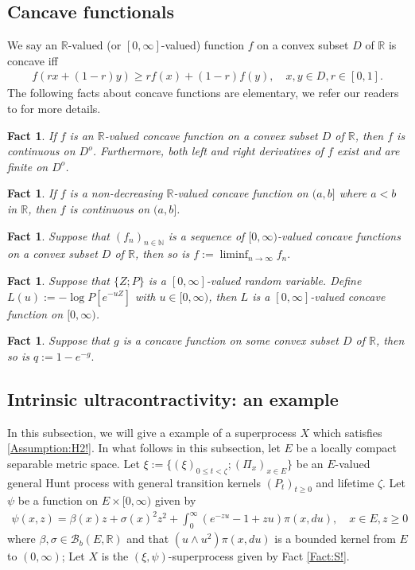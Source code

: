 \documentclass[12pt,a4paper]{amsart}
\numberwithin{equation}{section}
\theoremstyle{plain}
\newtheorem{fact}[thm]{Fact}
\theoremstyle{definition}
\theoremstyle{remark}
\newcounter{N}
\newcounter{n}[N]
\begin{document}
\subsection{Cancave functionals}
We say an $\mathbb R$-valued (or $[0,\infty]$-valued) function $f$ on a convex subset $D$ of $\mathbb R$ is concave iff
\begin{align}
   f(rx+(1-r) y) 
 \geq r f(x) + (1-r) f(y),
 \quad x,y \in D, r \in [0,1]. 
 \end{align}
The following facts about concave functions are elementary, we refer our readers to \cite[Chapter 6]{Dudley2002Real} for more details.

\begin{fact} \label{Fact:CC!} 
If $f$ is an $\mathbb R$-valued concave function on a convex subset $D$ of $\mathbb R$, then $f$ is continuous on $D^o$. 
Furthermore, both left and right derivatives of $f$ exist and are finite on $D^o$.
\end{fact}

\begin{fact} \label{Fact:CR!} 
If $f$ is a non-decreasing $\mathbb R$-valued concave function on $(a,b]$ where $a<b$ in $\mathbb R$, then $f$ is continuous on $(a,b]$.
\end{fact}

\begin{fact} \label{Fact:CL!} 
Suppose that $(f_n)_{n \in \mathbb N}$ is a sequence of $[0,\infty)$-valued concave functions on a convex subset $D$ of $\mathbb R$, then so is $f:= \liminf_{n\to \infty} f_n.$
\end{fact}

\begin{fact} \label{Fact:CP!} 
Suppose that $\{Z; P\}$ is a $[0,\infty]$-valued random variable. 
Define $L(u):= - \log P[e^{- u Z}]$ with $u \in [0,\infty)$, then $L$ is a $[0,\infty]$-valued concave function on $[0,\infty)$.
\end{fact}
\begin{fact} \label{Fact:CE!} 
Suppose that $g$ is a concave function on some convex subset $D$ of $\mathbb R$, then so is $q:= 1- e^{-g}.$
\end{fact}
\subsection{Intrinsic ultracontractivity: an example}
In this subsection, we will give a example of a superprocess $X$ which satisfies \ref{Assumption:H2!}.
In what follows in this subsection, let $E$ be a locally compact separable metric space.
Let $\xi:= \{(\xi)_{0\leq t < \zeta}; (\Pi_x)_{x\in E}\}$ be an $E$-valued general Hunt process with general transition kernels $(P_t)_{t\geq 0}$ and lifetime $\zeta$.
Let $\psi$ be a function on $E \times [0,\infty)$ given by 
\begin{align} 
\psi(x,z) 
= \beta(x) z + \sigma(x)^2 z^2 + \int_0^\infty (e^{-zu} -1 + zu) \pi(x,du), 
\quad x\in E, z\geq 0 
\end{align} 
where $\beta, \sigma \in \mathcal B_b(E,\mathbb R)$ and that $(u \wedge u^2) \pi(x,du)$ is a bounded kernel from $E$ to $(0,\infty)$;
Let $X$ is the $(\xi, \psi)$-superprocess given by Fact \ref{Fact:S!}.
\end{document}
